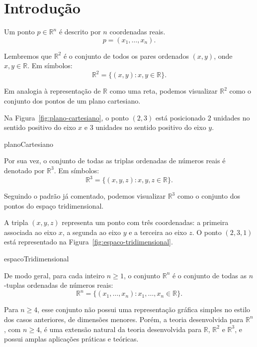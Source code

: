 \section{Introdução}
Um ponto $p \in \mathbb R^n$ é descrito por $n$ coordenadas reais.
\[
    p = (x_1, \dots, x_n).
\]

Lembremos que $\mathbb R^2$ é o conjunto de todos os pares ordenados $(x, y)$, onde $x, y \in \mathbb R$.
Em símbolos:
\begin{equation*}
    \mathbb R^2 = \{(x, y) : x, y \in \mathbb R\}.
\end{equation*}

Em analogia à representação de $\mathbb R$ como uma reta, podemos visualizar $\mathbb R^2$ como o conjunto dos pontos de um plano cartesiano.

Na Figura~\ref{fig:plano-cartesiano}, o ponto $(2,3)$ está posicionado $2$ unidades no sentido positivo do eixo $x$ e $3$ unidades no sentido positivo do eixo $y$.

{planoCartesiano}

Por sua vez, o conjunto de todas as triplas ordenadas de números reais é denotado por $\mathbb R^3$.
Em símbolos:
\begin{equation*}
    \mathbb R^3 = \{(x, y, z) : x, y, z \in \mathbb R\}.
\end{equation*}

Seguindo o padrão já comentado, podemos visualizar $\mathbb R^3$ como o conjunto dos pontos do espaço tridimensional.

A tripla $(x,y,z)$ representa um ponto com três coordenadas: a primeira associada ao eixo $x$, a segunda ao eixo $y$ e a terceira ao eixo $z$.
O ponto $(2,3,1)$ está representado na Figura~\ref{fig:espaco-tridimensional}.

{espacoTridimensional}

De modo geral, para cada inteiro $n\geq 1$, o conjunto $\mathbb R^n$ é o conjunto de todas as $n$-tuplas ordenadas de números reais:
\begin{equation*}
    \mathbb R^n = \{(x_1, \ldots, x_n) : x_1, \ldots, x_n \in \mathbb R\}.
\end{equation*}

Para $n\geq 4$, esse conjunto não possui uma representação gráfica simples no estilo dos casos anteriores, de dimensões menores.
Porém, a teoria desenvolvida para $\mathbb R^n$, com $n\geq 4$, é uma extensão natural da teoria desenvolvida para $\mathbb R$, $\mathbb R^2$ e $\mathbb R^3$, e possui amplas aplicações práticas e teóricas.


